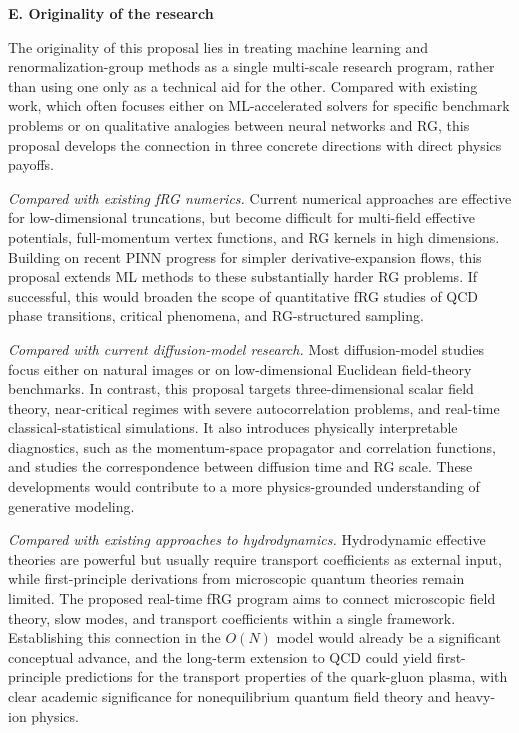 \documentclass[11pt,a4paper]{article}
\begin{document}
\vspace{0.5cm}
\textbf{E. Originality of the research}

The originality of this proposal lies in treating machine learning and renormalization-group methods as a single multi-scale research program, rather than using one only as a technical aid for the other. Compared with existing work, which often focuses either on ML-accelerated solvers for specific benchmark problems or on qualitative analogies between neural networks and RG, this proposal develops the connection in three concrete directions with direct physics payoffs.

\textit{Compared with existing fRG numerics.}
Current numerical approaches are effective for low-dimensional truncations, but become difficult for multi-field effective potentials, full-momentum vertex functions, and RG kernels in high dimensions. Building on recent PINN progress for simpler derivative-expansion flows\cite{Tan:2026bqn}, this proposal extends ML methods to these substantially harder RG problems. If successful, this would broaden the scope of quantitative fRG studies of QCD phase transitions, critical phenomena, and RG-structured sampling.

\textit{Compared with current diffusion-model research.}
Most diffusion-model studies focus either on natural images or on low-dimensional Euclidean field-theory benchmarks\cite{Wang:2023exq}. In contrast, this proposal targets three-dimensional scalar field theory, near-critical regimes with severe autocorrelation problems, and real-time classical-statistical simulations. It also introduces physically interpretable diagnostics, such as the momentum-space propagator and correlation functions, and studies the correspondence between diffusion time and RG scale. These developments would contribute to a more physics-grounded understanding of generative modeling.

\textit{Compared with existing approaches to hydrodynamics.}
Hydrodynamic effective theories are powerful but usually require transport coefficients as external input, while first-principle derivations from microscopic quantum theories remain limited. The proposed real-time fRG program aims to connect microscopic field theory, slow modes, and transport coefficients within a single framework. Establishing this connection in the $O(N)$ model would already be a significant conceptual advance, and the long-term extension to QCD could yield first-principle predictions for the transport properties of the quark-gluon plasma, with clear academic significance for nonequilibrium quantum field theory and heavy-ion physics.
\end{document}
